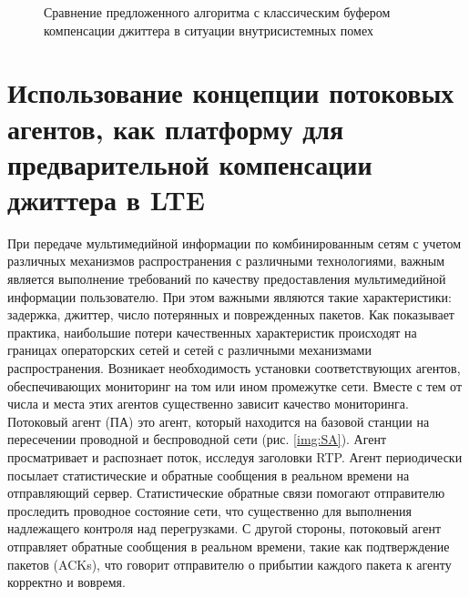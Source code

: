 \pgfplotsset{width=15cm, height=10cm, compat=1.3}
\begin{figure} [!ht]
  \center
{}
\caption{Сравнение предложенного алгоритма с классическим буфером компенсации джиттера в ситуации внутрисистемных помех}
  \label{img4:distBuff}
\end{figure}





\section{Использование концепции потоковых агентов, как платформу для предварительной компенсации джиттера в LTE} \label{sect_sa}


При передаче мультимедийной информации по комбинированным сетям с учетом различных механизмов распространения с различными технологиями, важным является выполнение требований по качеству предоставления мультимедийной информации пользователю.
При этом важными являются такие характеристики: задержка, джиттер, число потерянных и поврежденных пакетов. Как показывает практика, наибольшие потери качественных характеристик происходят на границах операторских сетей и сетей с различными механизмами распространения.
Возникает необходимость установки соответствующих агентов, обеспечивающих мониторинг на том или ином промежутке сети. Вместе с тем от числа и места этих агентов существенно зависит качество мониторинга.
Потоковый агент (ПА) это агент, который находится на базовой станции на пересечении проводной и беспроводной сети (рис. \ref{img:SA}). Агент просматривает и распознает поток, исследуя заголовки RTP. Агент периодически посылает статистические и обратные сообщения в реальном времени на отправляющий сервер. Статистические обратные связи помогают отправителю проследить проводное состояние сети, что существенно для выполнения надлежащего контроля над перегрузками. С другой стороны, потоковый агент отправляет обратные сообщения в реальном времени, такие как подтверждение пакетов (ACKs), что говорит отправителю о прибытии каждого пакета к агенту корректно и вовремя.


